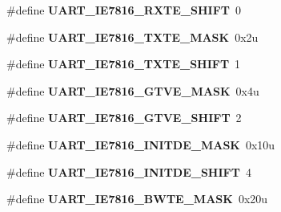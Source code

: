 \begin{DoxyCompactItemize}
\item 
\#define {\bfseries U\+A\+R\+T\+\_\+\+I\+E7816\+\_\+\+R\+X\+T\+E\+\_\+\+S\+H\+I\+FT}~0\hypertarget{group__UART__Register__Masks_ga0df3e70bd53348388872ae57a8f7f156}{}\label{group__UART__Register__Masks_ga0df3e70bd53348388872ae57a8f7f156}

\item 
\#define {\bfseries U\+A\+R\+T\+\_\+\+I\+E7816\+\_\+\+T\+X\+T\+E\+\_\+\+M\+A\+SK}~0x2u\hypertarget{group__UART__Register__Masks_ga5968d2ee914444772fe2e6fa65ca848b}{}\label{group__UART__Register__Masks_ga5968d2ee914444772fe2e6fa65ca848b}

\item 
\#define {\bfseries U\+A\+R\+T\+\_\+\+I\+E7816\+\_\+\+T\+X\+T\+E\+\_\+\+S\+H\+I\+FT}~1\hypertarget{group__UART__Register__Masks_gad0266a63ef5e0bb5dfaa2c87c2a1639e}{}\label{group__UART__Register__Masks_gad0266a63ef5e0bb5dfaa2c87c2a1639e}

\item 
\#define {\bfseries U\+A\+R\+T\+\_\+\+I\+E7816\+\_\+\+G\+T\+V\+E\+\_\+\+M\+A\+SK}~0x4u\hypertarget{group__UART__Register__Masks_ga64b8f696aa038e3a27d743e024632e7d}{}\label{group__UART__Register__Masks_ga64b8f696aa038e3a27d743e024632e7d}

\item 
\#define {\bfseries U\+A\+R\+T\+\_\+\+I\+E7816\+\_\+\+G\+T\+V\+E\+\_\+\+S\+H\+I\+FT}~2\hypertarget{group__UART__Register__Masks_ga92681ae737e84944e46e525a831303b9}{}\label{group__UART__Register__Masks_ga92681ae737e84944e46e525a831303b9}

\item 
\#define {\bfseries U\+A\+R\+T\+\_\+\+I\+E7816\+\_\+\+I\+N\+I\+T\+D\+E\+\_\+\+M\+A\+SK}~0x10u\hypertarget{group__UART__Register__Masks_ga6e0fc67109bbfda4ecffbb29a7bdcac7}{}\label{group__UART__Register__Masks_ga6e0fc67109bbfda4ecffbb29a7bdcac7}

\item 
\#define {\bfseries U\+A\+R\+T\+\_\+\+I\+E7816\+\_\+\+I\+N\+I\+T\+D\+E\+\_\+\+S\+H\+I\+FT}~4\hypertarget{group__UART__Register__Masks_ga92e0d4cc206532c7e058e7b0eae64492}{}\label{group__UART__Register__Masks_ga92e0d4cc206532c7e058e7b0eae64492}

\item 
\#define {\bfseries U\+A\+R\+T\+\_\+\+I\+E7816\+\_\+\+B\+W\+T\+E\+\_\+\+M\+A\+SK}~0x20u\hypertarget{group__UART__Register__Masks_ga1c4d8cb11c43f38d1d2254ae85517aa0}{}\label{group__UART__Register__Masks_ga1c4d8cb11c43f38d1d2254ae85517aa0}


\end{DoxyCompactItemize}

